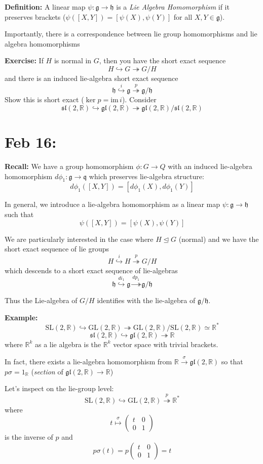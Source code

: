\documentclass[12pt]{article}
\newcommand{\R}{\mathbb{R}}
\newcommand{\SL}{\text{SL}}
\newcommand{\GL}{\text{GL}}
\newcommand{\g}{\mathfrak{g}}
\newcommand{\h}{\mathfrak{h}}
\renewcommand{\sl}{\mathfrak{sl}}
\newcommand{\gl}{\mathfrak{gl}}
\newcommand{\im}{\text{im}\,}
\begin{document}
    \textbf{Definition:} A linear map $\psi: \g \to \h$ is a \emph{Lie Algebra Homomorphism} if it preserves brackets ($\psi([X, Y]) = [\psi(X), \psi(Y)]$ for all $X, Y \in \g$).
 
    Importantly, there is a correspondence between lie group homomorphisms and lie algebra homomorphisms

    \textbf{Exercise:} If $H$ is normal in $G$, then you have the short exact sequence 
    \[H \hookrightarrow G \twoheadrightarrow G/H\]
    and there is an induced lie-algebra short exact sequence 
    \[\h \overset{i}{\hookrightarrow} \g \overset{p}{\twoheadrightarrow} \g/\h\]
    Show this is short exact ($\ker p = \im i$). Consider 
    \[\sl(2, \R) \hookrightarrow \gl(2, \R) \twoheadrightarrow \gl(2, \R)/\sl(2, \R)\]

\section{Feb 16:}
    \textbf{Recall:} We have a group homomorphism $\phi: G \to Q$ with an induced lie-algebra homomorphism $d\phi_1: \g \to \mathfrak{q}$ which preserves lie-algebra structure: 
    \[d\phi_1([X, Y]) = [d\phi_1(X), d\phi_1(Y)]\]
    
    In general, we introduce a lie-algebra homomorphism as a linear map $\psi: \g \to \h$ such that 
    \[\psi([X, Y]) = [\psi(X), \psi(Y)]\]

    We are particularly interested in the case where $H \trianglelefteq G$ (normal) and we have the short exact sequence of lie groups
    \[H \overset{i}{\hookrightarrow} H \overset{p}{\twoheadrightarrow} G/H\]
    which descends to a short exact sequence of lie-algebras 
    \[\h \overset{di_1}{\hookrightarrow} \g \overset{dp_1}{\twoheadrightarrow} \g/\h\]
    
    Thus the Lie-algebra of $G/H$ identifies with the lie-algebra of $\g/\h$. 

    \textbf{Example:}
    \[\SL(2, \R) \hookrightarrow \GL(2, \R) \twoheadrightarrow \GL(2, \R)/\SL(2, \R) \simeq \R^*\] 
    \[\sl(2, \R) \hookrightarrow \gl(2, \R) \twoheadrightarrow \R\]
    where $\R^k$ as a lie algebra is the $\R^k$ vector space with trivial brackets. 

    In fact, there exists a lie-algebra homomorphism from $\R \overset{\sigma}{\longrightarrow} \gl(2, \R)$ so that $p\sigma = 1_{\R}$ (\emph{section} of $\gl(2, \R) \to \R$)

    Let's inspect on the lie-group level:
    \[\SL(2, \R) \hookrightarrow \GL(2, \R) \overset{p}{\twoheadrightarrow} \R^*\] 
    where 
    \[t \overset{\sigma}{\mapsto} \begin{pmatrix}
        t & 0\\ 
        0 & 1
    \end{pmatrix}\]
    is the inverse of $p$ and 
    \[p\sigma(t) = p\begin{pmatrix}
        t & 0\\ 
        0 & 1
    \end{pmatrix} = t\]
\end{document}
